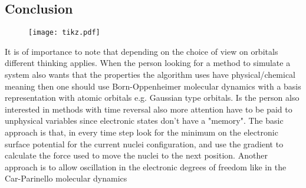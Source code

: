 \documentclass[12pt]{scrartcl}
\begin{document}
\subsection{Conclusion}

\newpage
\begin{landscape}
\begin{figure}
\texttt{[image: tikz.pdf]}
\end{figure}
%
\end{landscape}
\newpage

\nocite{marx2009ab} %
\nocite{payne1992iterative} %
\nocite{pulay2004fock} %
\nocite{fischer1987general} %

It is of importance to note that depending on the choice of view on orbitals different thinking applies. When the person looking for a method to simulate a system also wants that the properties the algorithm uses have physical/chemical meaning then one should use Born-Oppenheimer molecular dynamics with a basis representation with atomic orbitals e.g. Gaussian type orbitals. Is the person also interested in methods with time reversal also more attention have to be paid to unphysical variables since electronic states don't have a "memory". The basic approach is that, in every time step look for the minimum on the electronic surface potential for the current nuclei configuration, and use the gradient to calculate the force used to move the nuclei to the next position. Another approach is to allow oscillation in the electronic degrees of freedom like in the Car-Parinello molecular dynamics 

\newpage


\end{document}
